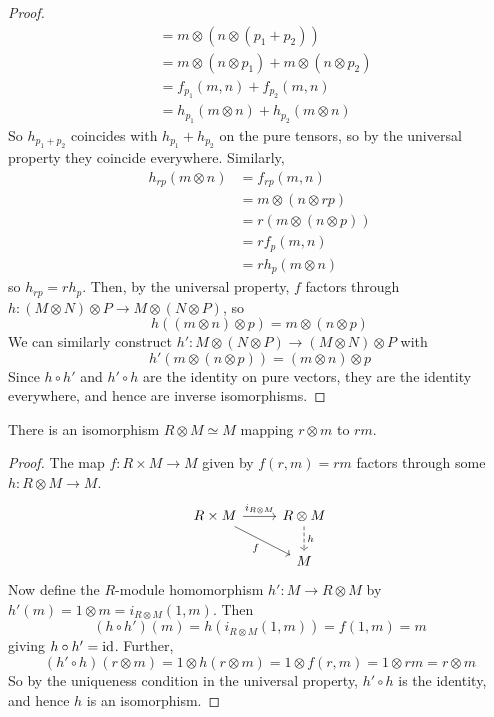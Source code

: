 \begin{proof}
\begin{align*}
        &= m \otimes (n \otimes (p_1 + p_2)) \\
        &= m \otimes (n \otimes p_1) + m \otimes (n \otimes p_2) \\
        &= f_{p_1}(m, n) + f_{p_2}(m, n) \\
        &= h_{p_1}(m \otimes n) + h_{p_2}(m \otimes n)
    \end{align*}
    So \( h_{p_1 + p_2} \) coincides with \( h_{p_1} + h_{p_2} \) on the pure tensors, so by the universal property they coincide everywhere.
    Similarly,
    \begin{align*}
        h_{rp}(m \otimes n) &= f_{rp}(m, n) \\
        &= m \otimes (n \otimes rp) \\
        &= r (m \otimes (n \otimes p)) \\
        &= r f_p(m, n) \\
        &= r h_p(m \otimes n)
    \end{align*}
    so \( h_{rp} = rh_p \).
    Then, by the universal property, \( f \) factors through \( h : (M \otimes N) \otimes P \to M \otimes (N \otimes P) \), so
    \[ h((m \otimes n) \otimes p) = m \otimes (n \otimes p) \]
    We can similarly construct \( h' : M \otimes (N \otimes P) \to (M \otimes N) \otimes P \) with
    \[ h'(m \otimes (n \otimes p)) = (m \otimes n) \otimes p \]
    Since \( h \circ h' \) and \( h' \circ h \) are the identity on pure vectors, they are the identity everywhere, and hence are inverse isomorphisms.
\end{proof}
\begin{proposition}[identity]
    There is an isomorphism \( R \otimes M \simeq M \) mapping \( r \otimes m \) to \( rm \).
\end{proposition}
\begin{proof}
    The map \( f : R \times M \to M \) given by \( f(r, m) = rm \) factors through some \( h : R \otimes M \to M \).
    \[\begin{tikzcd}
        {R \times M} & {R \otimes M} \\
        & M
        \arrow["{i_{R \otimes M}}", from=1-1, to=1-2]
        \arrow["h", dashed, from=1-2, to=2-2]
        \arrow["f"', from=1-1, to=2-2]
    \end{tikzcd}\]
    Now define the \( R \)-module homomorphism \( h' : M \to R \otimes M \) by \( h'(m) = 1 \otimes m = i_{R \otimes M}(1, m) \).
    Then
    \[ (h \circ h')(m) = h(i_{R \otimes M}(1, m)) = f(1, m) = m \]
    giving \( h \circ h' = \operatorname{id} \).
    Further,
    \[ (h' \circ h)(r \otimes m) = 1 \otimes h(r \otimes m) = 1 \otimes f(r, m) = 1 \otimes rm = r \otimes m \]
    So by the uniqueness condition in the universal property, \( h' \circ h \) is the identity, and hence \( h \) is an isomorphism.
\end{proof}
